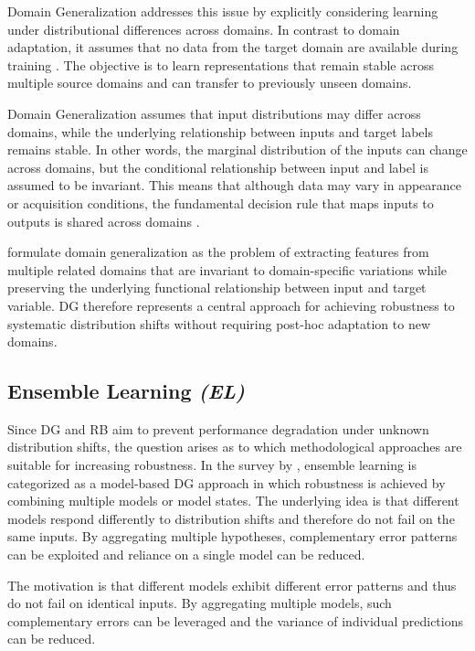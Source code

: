 Domain Generalization addresses this issue by explicitly considering learning under distributional differences across domains. 
In contrast to domain adaptation, it assumes that no data from the target domain are available during training \citep{pmlr-v28-muandet13}. 
The objective is to learn representations that remain stable across multiple source domains and can transfer to previously unseen domains.

Domain Generalization assumes that input distributions may differ across domains, while the underlying relationship between inputs and target labels remains stable. 
In other words, the marginal distribution of the inputs can change across domains, but the conditional relationship between input and label is assumed to be invariant. 
This means that although data may vary in appearance or acquisition conditions, the fundamental decision rule that maps inputs to outputs is shared across domains \citep{pmlr-v28-muandet13}.

\citet{pmlr-v28-muandet13} formulate domain generalization as the problem of extracting features from multiple related domains that are invariant to domain-specific variations while preserving the underlying functional relationship between input and target variable. 
DG therefore represents a central approach for achieving robustness to systematic distribution shifts without requiring post-hoc adaptation to new domains.

\subsection{Ensemble Learning \textit{(EL)}}
Since DG and RB aim to prevent performance degradation under unknown distribution shifts, the question arises as to which methodological approaches are suitable for increasing robustness. 
In the survey by \citet{zhouDomainGeneralizationSurvey2023}, ensemble learning is categorized as a model-based DG approach in which robustness is achieved by combining multiple models or model states. The underlying idea is that different models respond differently to distribution shifts and therefore do not fail on the same inputs. 
By aggregating multiple hypotheses, complementary error patterns can be exploited and reliance on a single model can be reduced.

The motivation is that different models exhibit different error patterns and thus do not fail on identical inputs. 
By aggregating multiple models, such complementary errors can be leveraged and the variance of individual predictions can be reduced.

